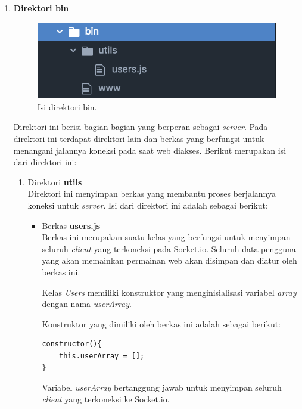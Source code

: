 \begin{enumerate}
	\item \textbf{Direktori bin} \\
	
	\begin{figure}[H]
		\centering
		\includegraphics[scale=0.4]{Gambar/direktori_bin}
		\caption{Isi direktori bin.}
		\label{fig:direktori_bin}
	\end{figure}
	
	Direktori ini berisi bagian-bagian yang berperan sebagai \textit{server}. Pada direktori ini terdapat direktori lain dan berkas yang berfungsi untuk menangani jalannya koneksi pada saat web diakses. Berikut merupakan isi dari direktori ini:
	\begin{enumerate}
		\item Direktori \textbf{utils} \\
		Direktori ini menyimpan berkas yang membantu proses berjalannya koneksi untuk \textit{server}. Isi dari direktori ini adalah sebagai berikut:
		\begin{itemize}
			\item Berkas \textbf{users.js}  \\
			Berkas ini merupakan suatu kelas yang berfungsi untuk menyimpan seluruh \textit{client} yang terkoneksi pada Socket.io. Seluruh data pengguna yang akan memainkan permainan web akan disimpan dan diatur oleh berkas ini.
			
			Kelas \textit{Users} memiliki konstruktor yang menginisialisasi variabel \textit{array} dengan nama \textit{userArray}.
			
			Konstruktor yang dimiliki oleh berkas ini adalah sebagai berikut:
\begin{lstlisting}[caption={konstruktor milik kelas \textit{Users}}, label={lst:konstruktorUsers}, captionpos=b]
constructor(){
	this.userArray = [];
}
\end{lstlisting}
			
			Variabel \textit{userArray} bertanggung jawab untuk menyimpan seluruh \textit{client} yang terkoneksi ke Socket.io.
			

\end{itemize}
\end{enumerate}
\end{enumerate}
